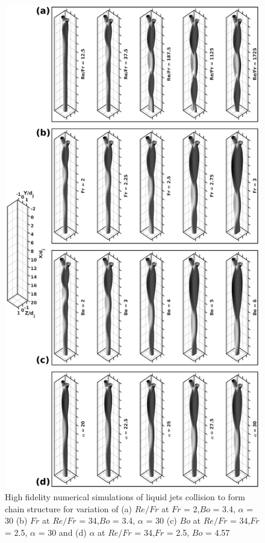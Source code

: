 \documentclass[%
aip,
sd,%
amsmath,amssymb,
preprint,%
author-year,%
]{revtex4-1}
\begin{document}
\begin{figure}
	\centering
	\includegraphics[width=0.68\linewidth]{phaseContours}
	\caption{High fidelity numerical simulations of liquid jets collision to form chain structure for variation of (a) $Re/Fr$ at $Fr$ = 2,$Bo$ = 3.4, $\alpha$ = 30 (b) $Fr$ at $Re/Fr$ = 34,$Bo$ = 3.4, $\alpha$ =  30 (c) $Bo$ at $Re/Fr$ = 34,$Fr$ = 2.5, $\alpha$ = 30 and (d) $\alpha$ at $Re/Fr$ = 34,$Fr$ = 2.5, $Bo$ = 4.57}
	\label{Figure::phaseContours}
\end{figure}
\end{document}
